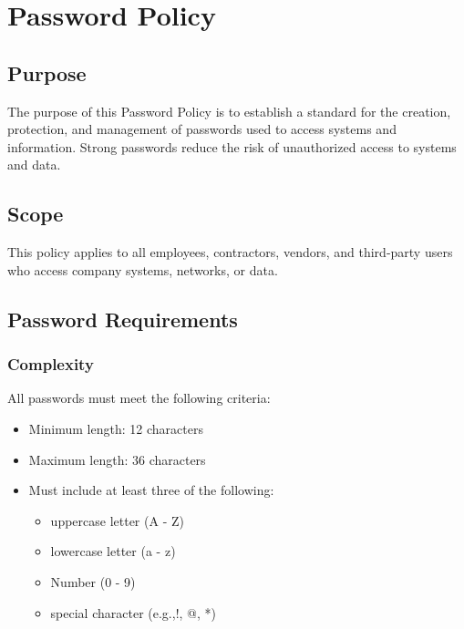 \chapter{Password Policy}
\pagestyle{fancy}

\fancyhf{}

\fancyfoot[C]{\thepage}

\renewcommand{\headrulewidth}{0pt}
\renewcommand{\footrulewidth}{0pt}

\section{Purpose}
The purpose of this Password Policy is to establish a standard for the creation, protection, and management of passwords used to access systems and information. Strong passwords reduce the risk of unauthorized access to systems and data.
\section{Scope}
This policy applies to all employees, contractors, vendors, and third-party users who access company systems, networks, or data.
\section{Password Requirements}
\subsection{Complexity}

All passwords must meet the following criteria:
\begin{itemize}
    \item Minimum length: 12 characters
    \item Maximum length: 36 characters
    \item Must include at least three of the following:
    \begin{itemize}
        \item uppercase letter (A - Z)
        \item lowercase letter (a - z)
        \item Number (0 - 9)
        \item special character (e.g.,!, @, *)
    \end{itemize}    
\end{itemize}

